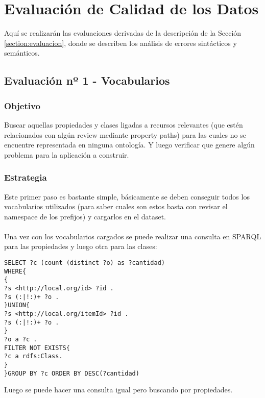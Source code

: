 \chapter{Evaluación de Calidad de los Datos}
\label{chapter:evaluacion}

Aquí se realizarán las evaluaciones derivadas de la descripción de la Sección \ref{section:evaluacion}, 
donde se describen los análisis de errores sintácticos y semánticos.

\section{Evaluación nº 1 - Vocabularios}
\label{section:evaluacion-vocabularios}

\subsection*{Objetivo}
Buscar aquellas propiedades y clases ligadas a recursos relevantes (que estén relacionados con algún review mediante property paths) 
para las cuales no se encuentre representada en ninguna ontología. Y luego verificar que genere algún problema para la aplicación a construir.

\subsection*{Estrategia}
Este primer paso es bastante simple, básicamente se deben conseguir todos los vocabularios utilizados (para saber cuales son estos basta con revisar el namespace 
de los prefijos) y cargarlos en el dataset.
\\\\
Una vez con los vocabularios cargados se puede realizar una consulta en SPARQL para las propiedades y luego otra para las clases:
\newpage
\begin{lstlisting}[frame=single]
SELECT ?c (count (distinct ?o) as ?cantidad)
WHERE{
{
?s <http://local.org/id> ?id .
?s (:|!:)+ ?o .
}UNION{
?s <http://local.org/itemId> ?id .
?s (:|!:)+ ?o .
}
?o a ?c .
FILTER NOT EXISTS{
?c a rdfs:Class.
}
}GROUP BY ?c ORDER BY DESC(?cantidad)
\end{lstlisting}

\noindent Luego se puede hacer una consulta igual pero buscando por propiedades.

